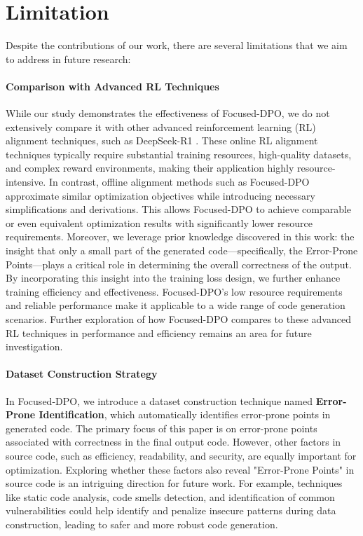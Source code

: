\section*{Limitation}

Despite the contributions of our work, there are several limitations that we aim to address in future research:

\paragraph{Comparison with Advanced RL Techniques}
While our study demonstrates the effectiveness of Focused-DPO, we do not extensively compare it with other advanced reinforcement learning (RL) alignment techniques, such as DeepSeek-R1 \cite{guo2025deepseekr1}. These online RL alignment techniques typically require substantial training resources, high-quality datasets, and complex reward environments, making their application highly resource-intensive.
In contrast, offline alignment methods such as Focused-DPO approximate similar optimization objectives while introducing necessary simplifications and derivations. 
This allows Focused-DPO to achieve comparable or even equivalent optimization results with significantly lower resource requirements. 
Moreover, we leverage prior knowledge discovered in this work: the insight that only a small part of the generated code—specifically, the Error-Prone Points—plays a critical role in determining the overall correctness of the output. By incorporating this insight into the training loss design, we further enhance training efficiency and effectiveness.
Focused-DPO’s low resource requirements and reliable performance make it applicable to a wide range of code generation scenarios. Further exploration of how Focused-DPO compares to these advanced RL techniques in performance and efficiency remains an area for future investigation.


\paragraph{Dataset Construction Strategy}
In Focused-DPO, we introduce a dataset construction technique named \textbf{Error-Prone Identification}, which automatically identifies error-prone points in generated code. 
The primary focus of this paper is on error-prone points associated with correctness in the final output code. However, other factors in source code, such as efficiency, readability, and security, are equally important for optimization.
Exploring whether these factors also reveal "Error-Prone Points" in source code is an intriguing direction for future work. For example, techniques like static code analysis, code smells detection, and identification of common vulnerabilities could help identify and penalize insecure patterns during data construction, leading to safer and more robust code generation.

